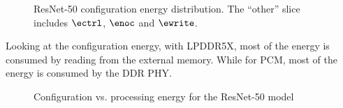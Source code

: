 

\begin{figure}[hbtp]
    \centering
    \hfill
    \caption{ResNet-50 configuration energy distribution. The ``other'' slice includes $\ectrl$, $\enoc$ and $\ewrite$.}
    \label{fig:resnet50_conf_energy_distribution}
\end{figure}

Looking at the configuration energy, with LPDDR5X, most of the energy is consumed by reading from the external memory.
While for PCM, most of the energy is consumed by the DDR PHY.

\begin{figure}[hbtp]
    \centering
    \hfill
    \caption{Configuration vs. processing energy for the ResNet-50 model}
    \label{fig:resnet50_conf_proc}
\end{figure}

